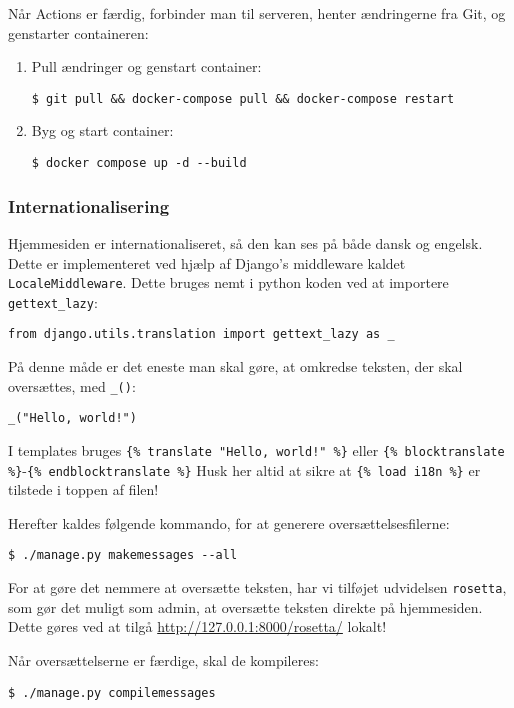 Når Actions er færdig, forbinder man til serveren, henter ændringerne fra Git, og genstarter containeren:

\begin{enumerate}
    \item Pull ændringer og genstart container:
    \begin{verbatim}
$ git pull && docker-compose pull && docker-compose restart\end{verbatim}
    \item Byg og start container:
    \begin{verbatim}
$ docker compose up -d --build\end{verbatim}
\end{enumerate}

\subsubsection{Internationalisering}

Hjemmesiden er internationaliseret, så den kan ses på både dansk og engelsk.
Dette er implementeret ved hjælp af Django's middleware kaldet \texttt{LocaleMiddleware}.
Dette bruges nemt i python koden ved at importere \texttt{gettext\_lazy}:
\begin{verbatim}
from django.utils.translation import gettext_lazy as _
\end{verbatim}
På denne måde er det eneste man skal gøre, at omkredse teksten, der skal oversættes, med \texttt{\_()}:
\begin{verbatim}
_("Hello, world!")
\end{verbatim}
I templates bruges \texttt{\{\% translate "Hello, world!" \%\}} eller 
\texttt{\{\% blocktranslate \%\}}-\texttt{\{\% endblocktranslate \%\}}
Husk her altid at sikre at \texttt{\{\% load i18n \%\}} er tilstede i toppen af filen!

Herefter kaldes følgende kommando, for at generere oversættelsesfilerne:
\begin{verbatim}
$ ./manage.py makemessages --all
\end{verbatim}
For at gøre det nemmere at oversætte teksten, har vi tilføjet udvidelsen \texttt{rosetta}, som
gør det muligt som admin, at oversætte teksten direkte på hjemmesiden. Dette gøres ved at tilgå
\url{http://127.0.0.1:8000/rosetta/} lokalt!

Når oversættelserne er færdige, skal de kompileres:
\begin{verbatim}
$ ./manage.py compilemessages
\end{verbatim}

